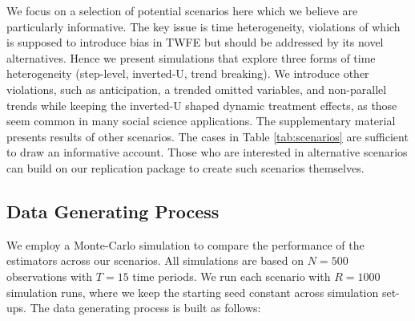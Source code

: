 We focus on a selection of potential scenarios here which we believe are particularly informative. The key issue is time heterogeneity, violations of which is supposed to introduce bias in TWFE but should be addressed by its novel alternatives. Hence we present simulations that explore three forms of time heterogeneity (step-level, inverted-U, trend breaking). We introduce other violations, such as anticipation, a trended omitted variables, and non-parallel trends while keeping the inverted-U shaped dynamic treatment effects, as those seem common in many social science applications. The supplementary material presents results of other scenarios. The cases in Table \ref{tab:scenarios} are sufficient to draw an informative account. Those who are interested in alternative scenarios can build on our replication package to create such scenarios themselves. 

\begin{table}
\caption{Various scenarios implemented in the simulations.}
\label{tab:scenarios}
\end{table}

\subsection{Data Generating Process}

We employ a Monte-Carlo simulation to compare the performance of the estimators across our scenarios. All simulations are based on $N = 500$ observations with $T=15$ time periods. We run each scenario with $R = 1000$ simulation runs, where we keep the starting seed constant across simulation set-ups. The data generating process is built as follows:


